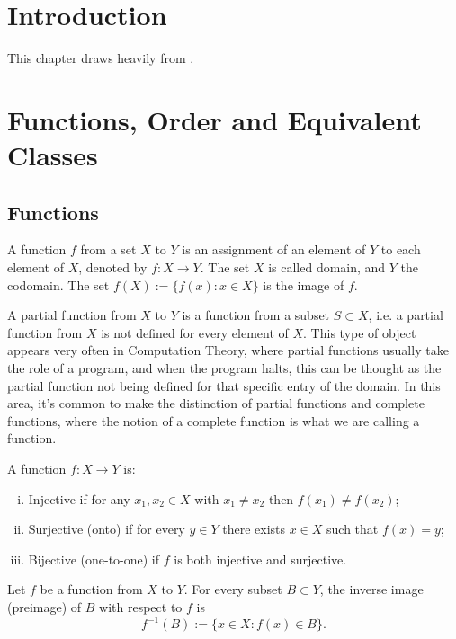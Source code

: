 \section{Introduction}

This chapter draws heavily from \citet{munkres2018elements}.

\section{Functions, Order and Equivalent Classes}

\subsection{Functions}

\begin{definition}[Functions]
  A function $f$ from a set $X$ to $Y$ is an assignment of an element of $Y$ to each element of $X$,
  denoted by $f: X \to Y$.
  The set $X$ is called domain, and $Y$ the codomain. The set $f(X):=\{f(x) :  x \in X\}$ is the
  image of $f$.

  A partial function from $X$ to $Y$ is a function from a subset $S \subset X$, i.e.
  a partial function from $X$ is not defined for every element of $X$.
  This type of object appears very often in Computation Theory, where partial functions
  usually take the role of a program, and when the program halts, this can be thought
  as the partial function not being defined for that specific entry of the domain.
  In this area, it's common to make the distinction of partial functions and complete functions,
  where the notion of a complete function is what we are calling a function.
\end{definition}

\begin{definition}
  A function $f:X \to Y$ is:
  \begin{enumerate}[(i)]
    \item Injective  if for any $x_1,x_2 \in X$ with $x_1 \neq x_2$ then $f(x_1) \neq f(x_2)$;
    \item Surjective (onto) if for every $y \in Y$ there exists $x \in X$ such that $f(x)= y$;
    \item Bijective (one-to-one) if $f$ is both injective and surjective.
  \end{enumerate}
\end{definition}

\begin{definition}
  Let $f$ be a function from $X$ to $Y$. For every subset $B \subset Y$, the
  inverse image (preimage) of $B$ with respect to $f$ is
  \begin{equation}
    f^{-1}(B) := \{x \in X : f(x) \in B\}.
    \label{eq:invimage}
  \end{equation}
\end{definition}

